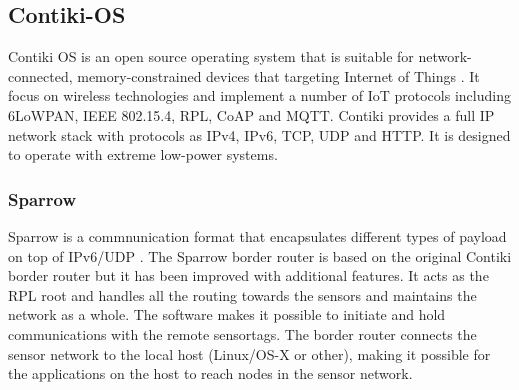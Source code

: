 \subsection{Contiki-OS}
Contiki OS is an open source operating system that is suitable for network-connected, memory-constrained devices that targeting Internet of Things \cite{contiki-os}. It focus on wireless technologies and implement a number of IoT protocols including 6LoWPAN, IEEE 802.15.4, RPL, CoAP and MQTT. Contiki provides a full IP network stack with protocols as IPv4, IPv6, TCP, UDP and HTTP. It is designed to operate with extreme low-power systems.


\subsubsection{Sparrow}
Sparrow is a commnunication format that encapsulates different types of payload on top of IPv6/UDP \cite{Sparrow}. The Sparrow border router is based on the original Contiki border router but it has been improved with additional features. It acts as the RPL root and handles all the routing towards the sensors and maintains the network as a whole. The software makes it possible to initiate and hold communications with the remote sensortags. The border router connects the sensor network to the local host (Linux/OS-X or other), making it possible for the applications on the host to reach nodes in the sensor network. 

